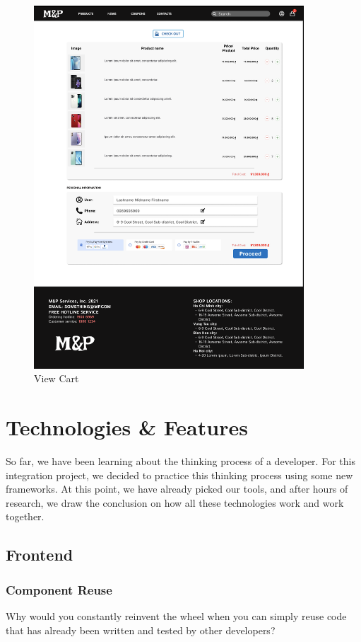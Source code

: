 \documentclass[a4paper]{article}
\numberwithin{equation}{section}
\begin{document}
\begin{figure}
  \centering
  \includegraphics[width=0.9\textwidth]{assets/p2/p4.png}
  \caption{View Cart}
\end{figure}

\newpage
\section{Technologies \& Features}
So far, we have been learning about the thinking process of a developer.
For this integration project, we decided to practice this thinking process using some new frameworks.
At this point, we have already picked our tools, and after hours of research, we draw the conclusion on how all these technologies work and work together.

\subsection{Frontend}
\subsubsection{Component Reuse}
Why would you constantly reinvent the wheel when you can simply reuse code that has already been written and tested by other developers?
\end{document}
